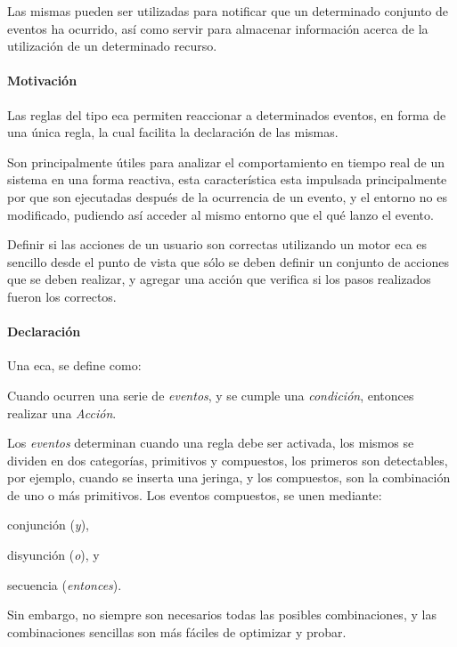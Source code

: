 Las mismas pueden ser utilizadas para notificar que un determinado conjunto de
eventos ha ocurrido\cite{bailey2004event}, así como servir para almacenar
información acerca de la utilización de un determinado recurso.


\paragraph{Motivación}

Las reglas del tipo \gls{eca} permiten reaccionar a determinados eventos, en
forma de una única regla, la cual facilita la declaración de las
mismas\cite{bailey2004event}.

Son principalmente útiles para analizar el comportamiento en tiempo real de un
sistema en una forma
reactiva\cite{bailey2004event}\cite{de2001eca}\cite{bailey2002analysis}, esta
característica esta impulsada principalmente por que son ejecutadas después de
la ocurrencia de un evento, y el entorno no es modificado, pudiendo así acceder
al mismo entorno que el qué lanzo el evento.

Definir si las acciones de un usuario son correctas utilizando un motor
\gls{eca} es sencillo desde el punto de vista que sólo se deben definir un
conjunto de acciones que se deben realizar, y agregar una acción que verifica si
los pasos realizados fueron los correctos.

\paragraph{Declaración}

Una \gls{eca}, se define como\cite{bailey2004event}\cite{behrends2006combining}:

\begin{center}
	 Cuando ocurren una serie de \emph{eventos}, y se cumple una
	 \emph{condición}, entonces realizar una \emph{Acción}.
\end{center}

Los \emph{eventos} determinan cuando una regla debe ser activada, los mismos se
dividen en dos categorías\cite{behrends2006combining}, primitivos y compuestos,
los primeros son detectables, por ejemplo, cuando se inserta una jeringa, y los
compuestos, son la combinación de uno o más
primitivos\cite{bailey2004event}\cite{behrends2006combining}. Los eventos
compuestos, se unen mediante:
\begin{enumerate*}[label=\itshape\alph*\upshape)]
\item conjunción (\emph{y}),
\item disyunción (\emph{o}), y
\item secuencia (\emph{entonces}).
\end{enumerate*}
Sin embargo, no siempre son necesarios todas las posibles combinaciones, y las
combinaciones sencillas son más fáciles de optimizar y
probar\cite{bailey2004event}.

